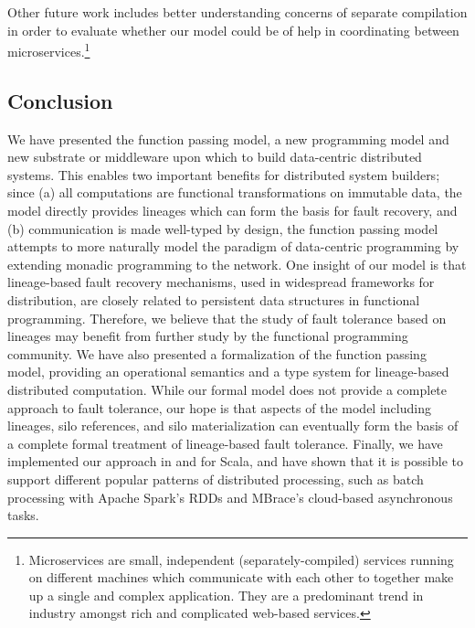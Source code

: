\documentclass{jfp1}
\begin{document}
Other future work includes better understanding concerns of separate compilation
in order to evaluate whether our model could be of help in coordinating between
microservices.\footnote{Microservices are small, independent
(separately-compiled) services running on different machines which communicate
with each other to together make up a single and complex application. They are a
predominant trend in industry amongst rich and complicated web-based services.}

\subsection{Conclusion}

We have presented the function passing model, a new programming model and new
substrate or middleware upon which to build data-centric distributed systems.
This enables two important benefits for distributed system builders; since (a)
all computations are functional transformations on immutable data, the model
directly provides lineages which can form the basis for fault recovery, and
(b) communication is made
well-typed by design, the function passing model attempts to more naturally
model the paradigm of data-centric programming by extending monadic programming
to the network. One insight of our model is that lineage-based fault recovery
mechanisms, used in widespread frameworks for distribution, are closely related
to persistent data structures in functional programming. Therefore, we believe
that the study of fault tolerance based on lineages may benefit from further
study by the functional programming community. We have also presented a
formalization of the function passing model, providing an operational
semantics and a type system for lineage-based distributed computation. While
our formal model does not provide a complete approach to fault tolerance,
our hope is that aspects of the model including lineages, silo references, and
silo materialization can eventually form the basis of a complete formal
treatment of lineage-based fault tolerance.
Finally, we have implemented our approach in and for Scala,
and have shown that it is possible to support different popular patterns of
distributed processing, such as  batch processing with Apache Spark's RDDs and
MBrace's cloud-based asynchronous tasks.

\end{document}
